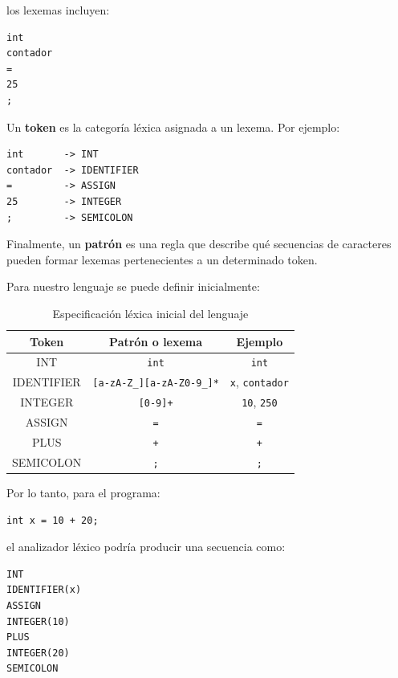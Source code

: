 \documentclass[11pt,a4paper]{article}
\begin{document}
los lexemas incluyen:

\begin{lstlisting}
int
contador
=
25
;
\end{lstlisting}

Un \textbf{token} es la categoría léxica asignada a un lexema. Por ejemplo:

\begin{lstlisting}
int       -> INT
contador  -> IDENTIFIER
=         -> ASSIGN
25        -> INTEGER
;         -> SEMICOLON
\end{lstlisting}

Finalmente, un \textbf{patrón} es una regla que describe qué secuencias de
caracteres pueden formar lexemas pertenecientes a un determinado token.

Para nuestro lenguaje se puede definir inicialmente:

\begin{table}[H]
\centering
\begin{tabular}{>{\ttfamily}c c c}
\toprule
\textbf{Token} & \textbf{Patrón o lexema} & \textbf{Ejemplo} \\
\midrule
INT &
\texttt{int} &
\texttt{int} \\

IDENTIFIER &
\texttt{[a-zA-Z\_][a-zA-Z0-9\_]*} &
\texttt{x}, \texttt{contador} \\

INTEGER &
\texttt{[0-9]+} &
\texttt{10}, \texttt{250} \\

ASSIGN &
\texttt{=} &
\texttt{=} \\

PLUS &
\texttt{+} &
\texttt{+} \\

SEMICOLON &
\texttt{;} &
\texttt{;} \\
\bottomrule
\end{tabular}
\caption{Especificación léxica inicial del lenguaje}
\label{tab:tokens}
\end{table}

Por lo tanto, para el programa:

\begin{lstlisting}
int x = 10 + 20;
\end{lstlisting}

el analizador léxico podría producir una secuencia como:

\begin{lstlisting}
INT
IDENTIFIER(x)
ASSIGN
INTEGER(10)
PLUS
INTEGER(20)
SEMICOLON
\end{lstlisting}
\end{document}
